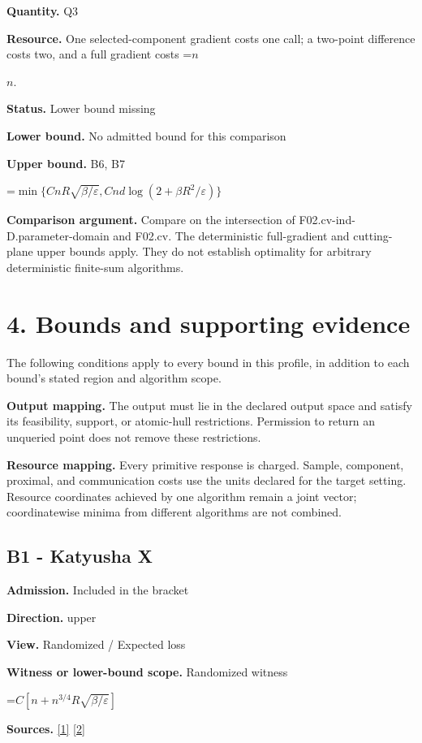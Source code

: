 \documentclass[10pt,a4paper]{article}
\newcommand{\AtlasMath}[1]{\par\begingroup\centering\setbox0=\hbox{$\displaystyle #1$}\ifdim\wd0>1.4\linewidth\typeout{ATLAS WIDE FORMULA: \the\wd0}\fi\ifdim\wd0>\linewidth\resizebox{\linewidth}{!}{\box0}\else\box0\fi\par\endgroup}
\newcommand{\AtlasInlineMath}[1]{\begingroup\setbox0=\hbox{$#1$}\ifdim\wd0>.4\linewidth\endgroup\AtlasMath{#1}\else\endgroup$#1$\fi}
\begin{document}
\textbf{Quantity.} Q3

\textbf{Resource.} One selected-component gradient costs one call; a two-point difference costs two, and a full gradient costs \AtlasInlineMath{n}.

\textbf{Status.} Lower bound missing

\textbf{Lower bound.} No admitted bound for this comparison

\textbf{Upper bound.} B6, B7

\AtlasMath{\min\{CnR\sqrt{\beta/\varepsilon},Cnd\log(2+\beta R^2/\varepsilon)\}}
\textbf{Comparison argument.} Compare on the intersection of F02.cv-ind-D.parameter-domain and F02.cv. The deterministic full-gradient and cutting-plane upper bounds apply. They do not establish optimality for arbitrary deterministic finite-sum algorithms.

\section{4. Bounds and supporting evidence}
The following conditions apply to every bound in this profile, in addition to each bound's stated region and algorithm scope.

\textbf{Output mapping.} The output must lie in the declared output space and satisfy its feasibility, support, or atomic-hull restrictions. Permission to return an unqueried point does not remove these restrictions.

\textbf{Resource mapping.} Every primitive response is charged. Sample, component, proximal, and communication costs use the units declared for the target setting. Resource coordinates achieved by one algorithm remain a joint vector; coordinatewise minima from different algorithms are not combined.

\subsection{B1 - Katyusha X}
\textbf{Admission.} Included in the bracket

\textbf{Direction.} upper

\textbf{View.} Randomized / Expected loss

\textbf{Witness or lower-bound scope.} Randomized witness

\AtlasMath{C[n+n^{3/4}R\sqrt{\beta/\varepsilon}]}
\textbf{Sources.} \href{https://arxiv.org/pdf/1802.03866}{[1]} \href{https://proceedings.mlr.press/v97/zhou19b/zhou19b.pdf}{[2]}
\end{document}
